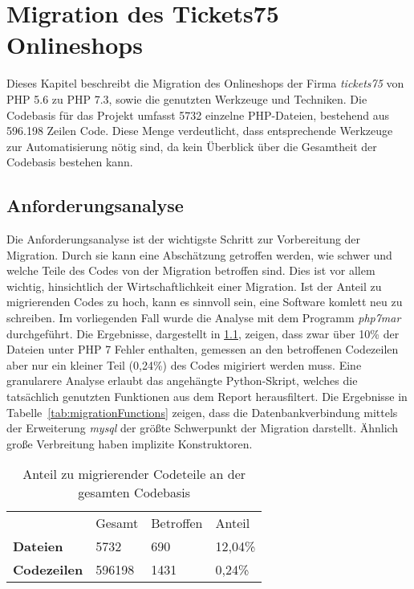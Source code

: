\chapter{Migration des Tickets75 Onlineshops}\label{ch:migration} 

Dieses Kapitel beschreibt die Migration des Onlineshops der Firma \textit{tickets75} von \ac{PHP} 5.6 zu \ac{PHP} 7.3, sowie die 
genutzten Werkzeuge und Techniken. Die Codebasis 
für das Projekt umfasst 5732 einzelne \ac{PHP}-Dateien, bestehend aus 596.198 Zeilen Code. Diese Menge verdeutlicht, dass 
entsprechende Werkzeuge zur Automatisierung nötig sind, da kein Überblick über die Gesamtheit der Codebasis bestehen kann.

\section{Anforderungsanalyse}
Die Anforderungsanalyse ist der wichtigste Schritt zur Vorbereitung der Migration. Durch sie kann eine Abschätzung getroffen werden, 
wie schwer und welche Teile des Codes von der Migration betroffen sind. Dies ist vor allem wichtig, hinsichtlich der 
Wirtschaftlichkeit einer Migration. Ist der Anteil zu migrierenden Codes zu hoch, kann es sinnvoll sein, eine Software 
komlett neu zu schreiben. Im vorliegenden Fall wurde die Analyse mit dem Programm \textit{php7mar} durchgeführt.
Die Ergebnisse, dargestellt in \ref{tab:migrationPercentage}, zeigen, dass zwar über 10\% der Dateien unter \ac{PHP} 7 
Fehler enthalten, gemessen an den betroffenen Codezeilen aber nur ein kleiner Teil (0,24\%) des Codes migiriert werden muss.
Eine granularere Analyse erlaubt das angehängte Python-Skript, welches die tatsächlich genutzten Funktionen aus dem Report 
herausfiltert. Die Ergebnisse in Tabelle~\ref{tab:migrationFunctions} zeigen, dass die Datenbankverbindung mittels der 
Erweiterung \textit{mysql} der größte Schwerpunkt der Migration darstellt. Ähnlich große Verbreitung haben implizite 
Konstruktoren.
\begin{table}
    \centering
    \caption{Anteil zu migrierender Codeteile an der gesamten Codebasis}
    \label{tab:migrationPercentage}
    \begin{tabular}{llll}
                        & Gesamt & Betroffen & Anteil   \\
    \textbf{Dateien}    & 5732   & 690       & 12,04\%  \\
    \textbf{Codezeilen} & 596198 & 1431      & 0,24\%  
    \end{tabular}
\end{table}

